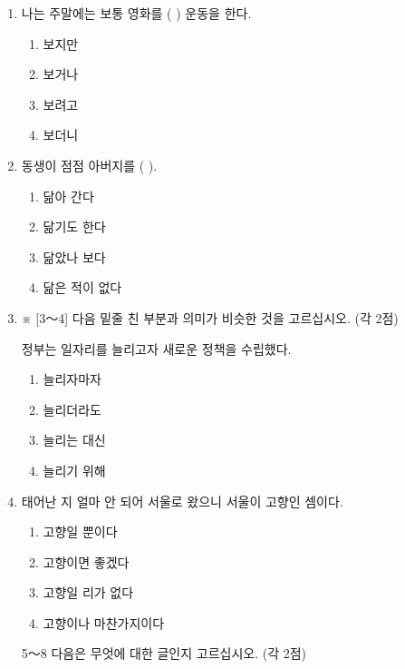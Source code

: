 \documentclass[12pt]{article}
\begin{document}
\begin{enumerate}[1.]
    \item 나는 주말에는 보통 영화를 (       ) 운동을 한다.

    \begin{enumerate}[1)]
        \item 보지만
        \item 보거나
        \item 보려고
        \item 보더니
    \end{enumerate}

    \item 동생이 점점 아버지를 (       ).

    \begin{enumerate}[1)]
        \item 닮아 간다
        \item 닮기도 한다
        \item 닮았나 보다
        \item 닮은 적이 없다
    \end{enumerate}


    \item ※ [3～4] 다음 밑줄 친 부분과 의미가 비슷한 것을 고르십시오. (각 2점)

    \bigskip

    정부는 일자리를 늘리고자 새로운 정책을 수립했다.

    \begin{enumerate}[1)]
        \item 늘리자마자
        \item 늘리더라도
        \item 늘리는 대신
        \item 늘리기 위해
    \end{enumerate}


    \item 태어난 지 얼마 안 되어 서울로 왔으니 서울이 고향인 셈이다.

    \begin{enumerate}[1)]
        \item 고향일 뿐이다
        \item 고향이면 좋겠다
        \item 고향일 리가 없다
        \item 고향이나 마찬가지이다
    \end{enumerate}




    \item [5～8] 다음은 무엇에 대한 글인지 고르십시오. (각 2점)


\end{enumerate}
\end{document}
